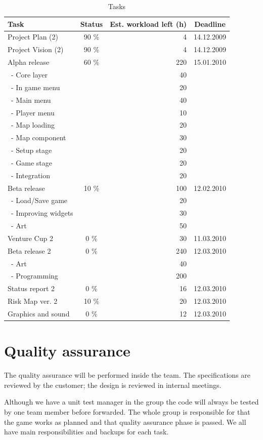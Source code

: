 \documentclass[12pt,a4paper]{article}
\begin{document}
\begin{table}[h!]
\small
\begin{tabular}{ l | c | r | c}
Task				&Status		&Est. workload left (h)	&Deadline \\\hline\hline
Project Plan (2) 	&90	\%		&4					&14.12.2009\\
Project Vision (2)	&90 	\%		&4					&14.12.2009\\
Alpha release		&60 	\%		&220				&15.01.2010\\
\ - Core layer		&			&40					&\\
\ - In game menu	&			&20					&\\
\ - Main menu		&			&40					&\\
\ - Player menu		&			&10					&\\
\ - Map loading		&			&20					&\\
\ - Map component	&			&30					&\\
\ - Setup stage		&			&20					&\\
\ - Game stage		&			&20					&\\
\ - Integration		&			&20					&\\
Beta release		&10 \%		&100				&12.02.2010\\
\ - Load/Save game	&			&20					&\\
\ - Improving widgets	&			&30					&\\
\ - Art				&			&50					&\\
Venture Cup 2		&0 \%		&30					&11.03.2010\\
Beta release 2		&0 \%		&240				&12.03.2010\\
\ - Art				&			&40					&\\
\ - Programming	&			&200				&\\
Status report 2		&0 \%		&16					&12.03.2010\\
Risk Map ver. 2		&10 \%		&20					&12.03.2010\\
Graphics and sound	&0 \%		&12					&12.03.2010
\end{tabular}
\caption{Tasks}
\label{tab:tasks}
\end{table}


\section{Quality assurance}

The quality assurance will be performed inside the team. The
specifications are reviewed by the customer; the design is reviewed in
internal meetings.

Although we have a unit test manager in the group the code will always
be tested by one team member before forwarded. The whole group is
responsible for that the game works as planned and that quality
assurance phase is passed. We all have main responsibilities and
backups for each task.
\end{document}
